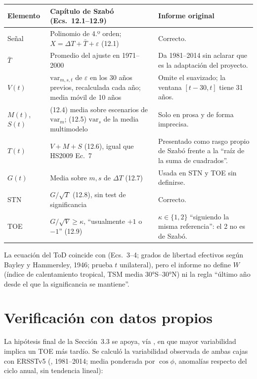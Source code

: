\begin{center}\small
\begin{tabular}{@{}L{2.2cm}L{5.4cm}L{\dimexpr\textwidth-7.6cm-4\tabcolsep\relax}@{}}
\toprule
Elemento & Capítulo de Szabó (Ecs.~12.1--12.9) & Informe original \\
\midrule
Señal & Polinomio de 4.º orden; $X=\Delta T+\bar T+\varepsilon$ (12.1) & Correcto. \\
$\bar T$ & Promedio del ajuste en 1971--2000 & Da 1981--2014 sin aclarar que es la adaptación del proyecto. \\
$V(t)$ & $\mathrm{var}_{m,s,t}$ de $\varepsilon$ en los 30 años previos, recalculada cada año; media móvil de 10 años & Omite el suavizado; la ventana $[t-30,t]$ tiene 31 años. \\
$M(t)$, $S(t)$ & (12.4) media sobre escenarios de $\mathrm{var}_m$; (12.5) $\mathrm{var}_s$ de la media multimodelo & Solo en prosa y de forma imprecisa. \\
$T(t)$ & $V+M+S$ (12.6), igual que HS2009 Ec.~7 & Presentado como rasgo propio de Szabó frente a la ``raíz de la suma de cuadrados''. \\
$G(t)$ & Media sobre $m,s$ de $\Delta T$ (12.7) & Usada en STN y TOE sin definirse. \\
STN & $G/\sqrt{T}$ (12.8), sin test de significancia & Correcto. \\
TOE & $G/\sqrt{V}\geq\kappa$, ``usualmente $+1$ o $-1$'' (12.9) & $\kappa\in\{1,2\}$ ``siguiendo la misma referencia'': el 2 no es de Szabó. \\
\bottomrule
\end{tabular}
\end{center}

La ecuación del ToD coincide con \citet{gopika2024} (Ecs.~3--4; grados de libertad efectivos según Bayley y Hammersley, 1946; prueba $t$ unilateral), pero el informe no define $W$ (índice de calentamiento tropical, TSM media 30°S--30°N) ni la regla ``último año desde el que la significancia se mantiene''.

\section{Verificación con datos propios}

La hipótesis final de la Sección~3.3 se apoya, vía \citet{chadwick2019}, en que mayor variabilidad implica un TOE más tardío. Se calculó la variabilidad observada de ambas cajas con ERSSTv5 (, 1981--2014; media ponderada por $\cos\phi$, anomalías respecto del ciclo anual, sin tendencia lineal):


